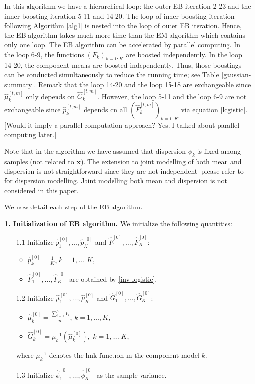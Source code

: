 \documentclass[11pt]{article}
\numberwithin{equation}{section}
\def\bx{\boldsymbol{x}}
\begin{document}
In this algorithm we have a hierarchical loop: the outer EB iteration 2-23 and the inner boosting iteration 5-11 and 14-20.
The loop of inner boosting iteration following Algorithm \ref{alg1} is nested into the loop of outer EB iteration.
Hence, the EB algorithm takes much more time than the EM algorithm which contains only one loop.
The EB algorithm can be accelerated by parallel computing.
In the loop 6-9, the functions $(F_k)_{k=1:K}$ are boosted independently. 
In the loop 14-20, the component means are boosted independently.
Thus, those  boostings can be conducted simultaneously to reduce the running time; see Table \ref{gaussian-summary}.
Remark that the loop 14-20 and the loop 15-18  are exchangeable since $\hat{\mu}_k^{[t,m]}$ only depends on $\hat{G}_k^{[t,m]}$. However, the loop 5-11 and the loop 6-9 are not exchangeable since $\hat{p}_k^{[t,m]}$ depends on all $(\hat{F}_k^{[t,m]})_{k=1:K}$ via equation \eqref{logistic}.
{\color{blue}[Would it imply a parallel computation approach? Yes. I talked about parallel computing later.]}

Note that  in the algorithm we have assumed that dispersion $\phi_k$ is fixed among samples (not related to $\bx$). The extension to joint modelling of both mean and dispersion  is not straightforward since they are not independent; please refer to \citet{jorgensen:1997} for dispersion modelling.
Joint modelling both mean and dispersion is not considered in this paper. 

We now detail each step of the EB algorithm.

{\bf 1. Initialization of EB algorithm.} We initialize the following quantities:
	\begin{enumerate}
		\item[1.1] Initialize $\hat{p}_1^{[0]}, \ldots,\hat{p}_K^{[0]}$ and   $\hat{F}_1^{[0]}, \ldots, \hat{F}_{K}^{[0]}$:
		
		\begin{itemize}
			\item 	$\hat{p}_k^{[0]}=\frac{1}{K}$, $k=1,\ldots,K,$
			\item $\hat{F}_1^{[0]}, \ldots, \hat{F}_{K}^{[0]}$ are obtained by \eqref{inv-logistic}.
		\end{itemize}
		\item[1.2]
		Initialize $\hat{\mu}_1^{[0]},\ldots,\hat{\mu}_K^{[0]}$ and  $\hat{G}_1^{[0]},\ldots,\hat{G}_K^{[0]}$:
		\begin{itemize}
			\item $\hat{\mu}_k^{[0]}=\frac{\sum_{i=1}^nY_i}{n}$, $k=1,\ldots,K,$
			\item $\hat{G}_k^{[0]}=\mu_k^{-1}(\hat{\mu}_k^{[0]}),$  $k=1,\ldots,K,$
		\end{itemize}
	where $\mu^{-1}_k$ denotes the link function in the component model $k$.
		\item[1.3] Initialize $\hat{\phi}_1^{[0]},\ldots, \hat{\phi}_K^{[0]}$ as the sample variance. 
	\end{enumerate}
\end{document}
